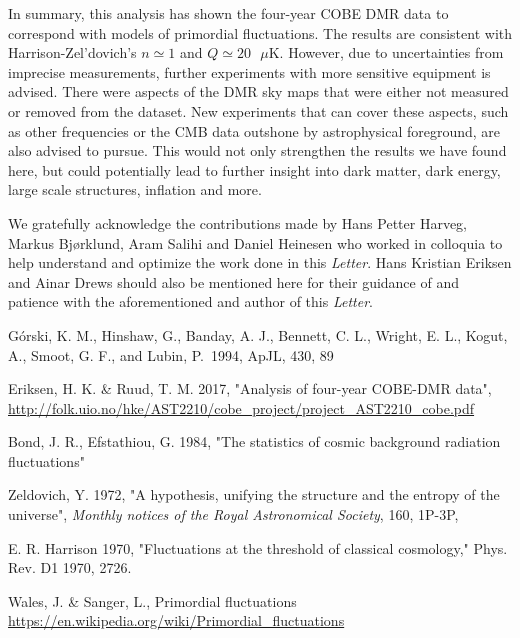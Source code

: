 \documentclass{emulateapj}
\begin{document}
In summary, this analysis has shown the four-year COBE DMR data to correspond with models of primordial fluctuations. The results are consistent with Harrison-Zel'dovich's $n \simeq 1$ and $Q \simeq 20 \text{ }\mu$K. However, due to uncertainties from imprecise measurements, further experiments with more sensitive equipment is advised. There were aspects of the DMR sky maps that were either not measured or removed from the dataset. New experiments that can cover these aspects, such as other frequencies or the CMB data outshone by astrophysical foreground, are also advised to pursue. This would not only strengthen the results we have found here, but could potentially lead to further insight into dark matter, dark energy, large scale structures, inflation and more.




\begin{acknowledgements}
  We gratefully acknowledge the contributions made by Hans Petter Harveg, Markus Bjørklund, Aram Salihi and Daniel Heinesen who worked in colloquia to help understand and optimize the work done in this \textit{Letter}. Hans Kristian Eriksen and Ainar Drews should also be mentioned here for their guidance of and patience with the aforementioned and author of this \textit{Letter}.
\end{acknowledgements}


\begin{thebibliography}{}

 G{\'o}rski, K. M.,
  Hinshaw, G., Banday, A. J., Bennett, C. L., Wright, E. L., Kogut,
  A., Smoot, G. F., and Lubin, P.\ 1994, ApJL, 430, 89

Eriksen, H. K. \& Ruud, T. M. 2017, "Analysis of four-year COBE-DMR data", \url{http://folk.uio.no/hke/AST2210/cobe_project/project_AST2210_cobe.pdf}

 Bond, J. R., Efstathiou, G. 1984,  "The statistics of cosmic background radiation ﬂuctuations"

Zeldovich, Y. 1972, "A hypothesis, unifying the structure and
the entropy of the universe", \textit{Monthly notices of the Royal Astronomical Society}, 160, 1P-3P, 

E. R. Harrison 1970,  "Fluctuations at the threshold of classical
cosmology," Phys. Rev. D1 1970, 2726.

Wales, J. \& Sanger, L., Primordial fluctuations \url{https://en.wikipedia.org/wiki/Primordial_fluctuations}\label{prim_fluc} %
\end{thebibliography}
\end{document}
